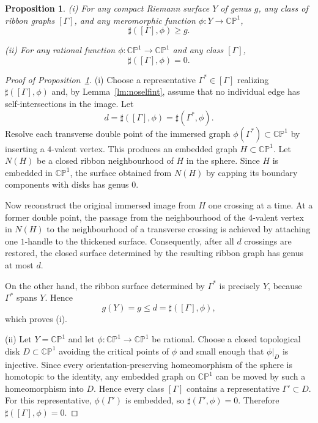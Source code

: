 \documentclass[10pt,a4paper]{amsart}
\newtheorem{proposition}{Proposition}
\newcommand {\Ga}{\Gamma}
\newcommand {\bCP} {\mathbb {CP}}
\begin{document}
\begin{proposition}\label{pr:im}
\rm
(i) For any compact Riemann surface $Y$ of genus $g$, any class of ribbon graphs $[\Ga]$, and any meromorphic function $\phi:Y\to \bCP^1$,
\[
\sharp([\Ga],\phi)\ge g.
\]

\smallskip
\noindent
(ii) For any rational function $\phi:\bCP^1\to \bCP^1$ and any class $[\Ga]$,
\[
\sharp([\Ga],\phi)=0.
\]
\end{proposition}

\begin{proof}[Proof of Proposition~\ref{pr:im}]
(i) Choose a representative $\Ga^*\in[\Ga]$ realizing $\sharp([\Ga],\phi)$ and, by Lemma~\ref{lm:noselfint}, assume that no individual edge has self-intersections in the image. Let
\[
d=\sharp([\Ga],\phi)=\sharp(\Ga^*,\phi).
\]
Resolve each transverse double point of the immersed graph $\phi(\Ga^*)\subset \bCP^1$ by inserting a $4$-valent vertex. This produces an embedded graph $H\subset \bCP^1$. Let $N(H)$ be a closed ribbon neighbourhood of $H$ in the sphere. Since $H$ is embedded in $\bCP^1$, the surface obtained from $N(H)$ by capping its boundary components with disks has genus $0$.

Now reconstruct the original immersed image from $H$ one crossing at a time. At a former double point, the passage from the neighbourhood of the $4$-valent vertex in $N(H)$ to the neighbourhood of a transverse crossing is achieved by attaching one $1$-handle to the thickened surface. Consequently, after all $d$ crossings are restored, the closed surface determined by the resulting ribbon graph has genus at most $d$.

On the other hand, the ribbon surface determined by $\Ga^*$ is precisely $Y$, because $\Ga^*$ spans $Y$. Hence
\[
g(Y)=g\le d=\sharp([\Ga],\phi),
\]
which proves (i).

(ii) Let $Y=\bCP^1$ and let $\phi:\bCP^1\to \bCP^1$ be rational. Choose a closed topological disk $D\subset \bCP^1$ avoiding the critical points of $\phi$ and small enough that $\phi|_D$ is injective. Since every orientation-preserving homeomorphism of the sphere is homotopic to the identity, any embedded graph on $\bCP^1$ can be moved by such a homeomorphism into $D$. Hence every class $[\Ga]$ contains a representative $\Ga'\subset D$. For this representative, $\phi(\Ga')$ is embedded, so $\sharp(\Ga',\phi)=0$. Therefore $\sharp([\Ga],\phi)=0$.
\end{proof}
\end{document}

